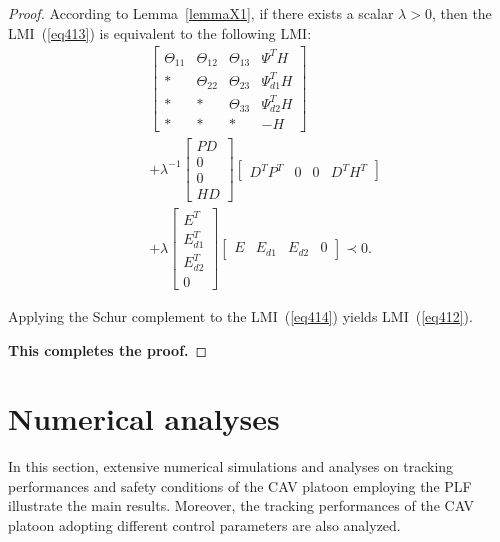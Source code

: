 \documentclass[journal]{IEEEtran}
\begin{document}
\begin{proof}
  According to Lemma~\ref{lemmaX1}, if there exists a scalar $\lambda>0$, then the LMI~(\ref{eq413}) is equivalent to the following LMI:
  \begin{equation}
    \begin{aligned}
    &\left[ {\begin{array}{*{20}{c}}
            {{\Theta _{11}}} & {{\Theta _{12}}} & {{\Theta _{13}}} & {{\Psi ^T}H}    \\
            *                & {{\Theta _{22}}} & {{\Theta _{23}}} & {\Psi _{d1}^TH} \\
            *                & *                & {{\Theta _{33}}} & {\Psi _{d2}^TH} \\
            *                & *                & *                & { - H}
          \end{array}} \right] \\
          &+ {\lambda ^{ - 1}}\left[ {\begin{array}{*{20}{c}}
            {PD} \\
            0    \\
            0    \\
            {HD}
          \end{array}} \right]\left[ {\begin{array}{*{20}{c}}
            {{D^T}{P^T}} & 0 & 0 & {{D^T}{H^T}}
          \end{array}} \right] \\
         & + \lambda \left[ {\begin{array}{*{20}{c}}
            {{E^T}}    \\
            {E_{d1}^T} \\
            {E_{d2}^T} \\
            0
          \end{array}} \right]\left[ {\begin{array}{*{20}{c}}
            E & {{E_{d1}}} & {{E_{d2}}} & 0
          \end{array}} \right] \prec 0.
        \end{aligned}
    \label{eq414}
  \end{equation}

  Applying the Schur complement to the LMI~(\ref{eq414}) yields LMI~(\ref{eq412}).

  \textbf{This completes the proof.}

\end{proof}

\section{Numerical analyses}
\label{Section 5}
In this section, extensive numerical simulations and analyses on tracking performances and safety conditions of the CAV platoon employing the PLF illustrate the main results. Moreover, the tracking performances of the CAV platoon adopting different control parameters are also analyzed.
\end{document}
